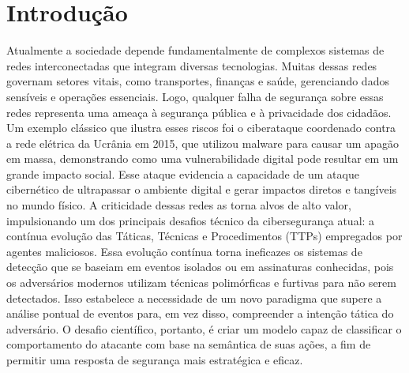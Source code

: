 \documentclass[12pt]{article}
\begin{document}
\section{Introdução} 
\label{sec:intro}
Atualmente a sociedade depende fundamentalmente de complexos sistemas de redes interconectadas que integram diversas tecnologias. Muitas dessas redes governam setores vitais, como transportes, finanças e saúde, gerenciando dados sensíveis e operações essenciais. Logo, qualquer falha de segurança sobre essas redes representa uma ameaça à segurança pública e à privacidade dos cidadãos\cite{khoshaba2024industry}. Um exemplo clássico que ilustra esses riscos foi o ciberataque coordenado contra a rede elétrica da Ucrânia em 2015, que utilizou malware para causar um apagão em massa, demonstrando como uma vulnerabilidade digital pode resultar em um grande impacto social. Esse ataque evidencia a capacidade de um ataque cibernético de ultrapassar o ambiente digital e gerar impactos diretos e tangíveis no mundo físico.
A criticidade dessas redes as torna alvos de alto valor, impulsionando um dos principais desafios técnico da cibersegurança atual: a contínua evolução das Táticas, Técnicas e Procedimentos (TTPs) empregados por agentes maliciosos. Essa evolução contínua torna ineficazes os sistemas de detecção que se baseiam em eventos isolados ou em assinaturas conhecidas, pois os adversários modernos utilizam técnicas polimórficas e furtivas para não serem detectados\cite{lopez2024cyber}. Isso estabelece a necessidade de um novo paradigma que supere a análise pontual de eventos para, em vez disso, compreender a intenção tática do adversário. O desafio científico, portanto, é criar um modelo capaz de classificar o comportamento do atacante com base na semântica de suas ações, a fim de permitir uma resposta de segurança mais estratégica e eficaz.
\end{document}
